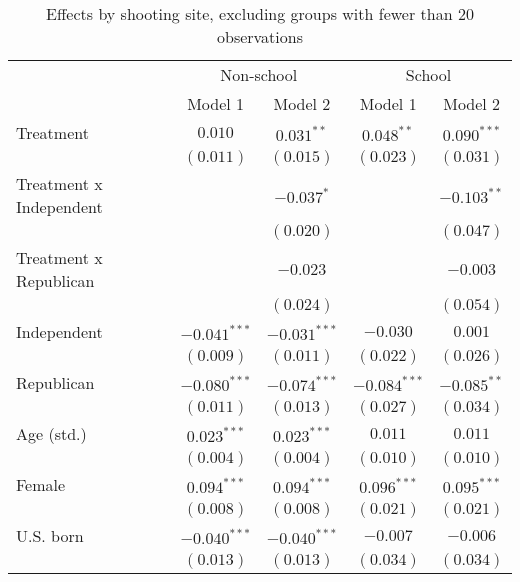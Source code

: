 
\begin{table}
\caption{Effects by shooting site, excluding groups with fewer than 20 observations}
\begin{center}
\begin{tabular}{l c c c c}
\toprule
 & \multicolumn{2}{c}{Non-school} & \multicolumn{2}{c}{School} \\
\cmidrule(lr){2-3} \cmidrule(lr){4-5}
 & Model 1 & Model 2 & Model 1 & Model 2 \\
\midrule
Treatment               & $0.010$        & $0.031^{**}$   & $0.048^{**}$   & $0.090^{***}$  \\
                        & $(0.011)$      & $(0.015)$      & $(0.023)$      & $(0.031)$      \\
Treatment x Independent &                & $-0.037^{*}$   &                & $-0.103^{**}$  \\
                        &                & $(0.020)$      &                & $(0.047)$      \\
Treatment x Republican  &                & $-0.023$       &                & $-0.003$       \\
                        &                & $(0.024)$      &                & $(0.054)$      \\
Independent             & $-0.041^{***}$ & $-0.031^{***}$ & $-0.030$       & $0.001$        \\
                        & $(0.009)$      & $(0.011)$      & $(0.022)$      & $(0.026)$      \\
Republican              & $-0.080^{***}$ & $-0.074^{***}$ & $-0.084^{***}$ & $-0.085^{**}$  \\
                        & $(0.011)$      & $(0.013)$      & $(0.027)$      & $(0.034)$      \\
Age (std.)              & $0.023^{***}$  & $0.023^{***}$  & $0.011$        & $0.011$        \\
                        & $(0.004)$      & $(0.004)$      & $(0.010)$      & $(0.010)$      \\
Female                  & $0.094^{***}$  & $0.094^{***}$  & $0.096^{***}$  & $0.095^{***}$  \\
                        & $(0.008)$      & $(0.008)$      & $(0.021)$      & $(0.021)$      \\
U.S. born               & $-0.040^{***}$ & $-0.040^{***}$ & $-0.007$       & $-0.006$       \\
                        & $(0.013)$      & $(0.013)$      & $(0.034)$      & $(0.034)$      \\

\end{tabular}
\end{center}
\end{table}
